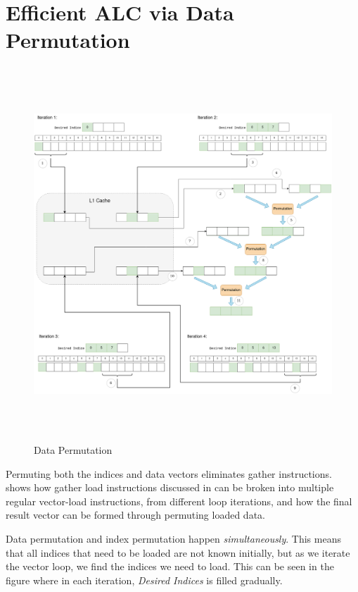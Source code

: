\section{Efficient ALC via Data Permutation}
\label{sec:alc-data-permutation}


\begin{figure}[t]
\includegraphics[width=1.1\textwidth, height= 14cm]{Figures/03-approach/Data_Permutation.drawio.png}
\caption{Data Permutation}
\label{fig:data-permutation}
\end{figure}

Permuting both the indices and data vectors eliminates gather instructions.
 shows how gather load instructions discussed in  can be broken into multiple regular vector-load instructions, from different loop iterations, and how the final result vector can be formed through permuting loaded data.

Data permutation and index permutation happen \emph{simultaneously}. This means that all indices that need to be loaded are not known initially, but as we iterate the vector loop, we find the indices we need to load. This can be seen in the figure where in each iteration, \emph{Desired Indices} is filled gradually. 

